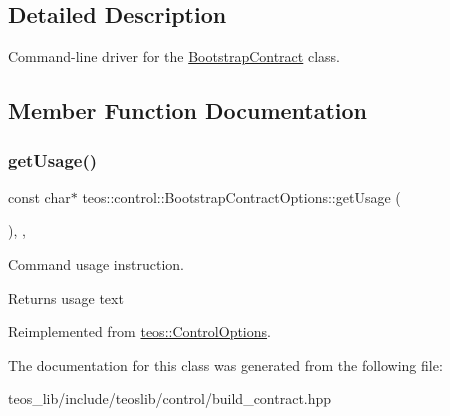 \subsection{Detailed Description}
Command-\/line driver for the \mbox{\hyperlink{classteos_1_1control_1_1_bootstrap_contract}{Bootstrap\+Contract}} class. 

\subsection{Member Function Documentation}
\mbox{\label{classteos_1_1control_1_1_bootstrap_contract_options_af0f63b7aff6d7d41ac9b4b1c542b93f0}} 
\subsubsection{\texorpdfstring{get\+Usage()}{getUsage()}}
{\footnotesize\ttfamily const char$\ast$ teos\+::control\+::\+Bootstrap\+Contract\+Options\+::get\+Usage (\begin{DoxyParamCaption}{ }\end{DoxyParamCaption})\hspace{0.3cm}{\ttfamily [inline]}, {\ttfamily [protected]}, {\ttfamily [virtual]}}



Command \textquotesingle{}usage\textquotesingle{} instruction. 

\begin{DoxyReturn}{Returns}
usage text 
\end{DoxyReturn}


Reimplemented from \mbox{\hyperlink{classteos_1_1_control_options_a0aa5671f9bc750ed5280c26c543874f3}{teos\+::\+Control\+Options}}.



The documentation for this class was generated from the following file\+:\begin{DoxyCompactItemize}
\item 
teos\+\_\+lib/include/teoslib/control/build\+\_\+contract.\+hpp\end{DoxyCompactItemize}
